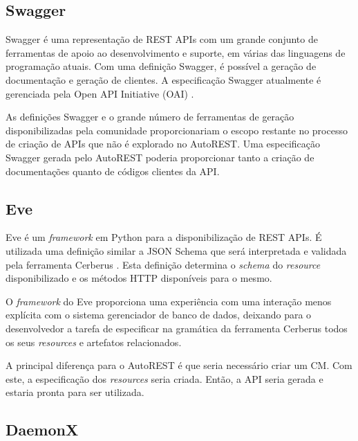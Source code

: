 \subsection{Swagger}

Swagger \cite{SWAGGER} é uma representação de REST APIs com um grande conjunto de ferramentas de apoio ao desenvolvimento e suporte, em várias das linguagens de programação atuais. Com uma definição Swagger, é possível a geração de documentação e geração de clientes. A especificação Swagger atualmente é gerenciada pela Open API Initiative (OAI) \cite{OpenAPII}.

As definições Swagger e o grande número de ferramentas de geração disponibilizadas pela comunidade proporcionariam o escopo restante no processo de criação de APIs que não é explorado no AutoREST. Uma especificação Swagger gerada pelo AutoREST poderia proporcionar tanto a criação de documentações quanto de códigos clientes da API.


\subsection{Eve}

Eve \cite{IAROCCI:EVE} é um \textit{framework} em Python para a disponibilização de REST APIs. É utilizada uma definição similar a JSON Schema que será interpretada e validada pela ferramenta Cerberus \cite{IAROCCI:CERBERUS}. Esta definição determina o \textit{schema} do \textit{resource} disponibilizado e os métodos HTTP disponíveis para o mesmo.

O \textit{framework} do Eve proporciona uma experiência com uma interação menos explícita com o sistema gerenciador de banco de dados, deixando para o desenvolvedor a tarefa de especificar na gramática da ferramenta Cerberus todos os seus \textit{resources} e artefatos relacionados.

A principal diferença para o AutoREST é que seria necessário criar um CM. Com este, a especificação dos \textit{resources} seria criada. Então, a API seria gerada e estaria pronta para ser utilizada.


\subsection{DaemonX}

